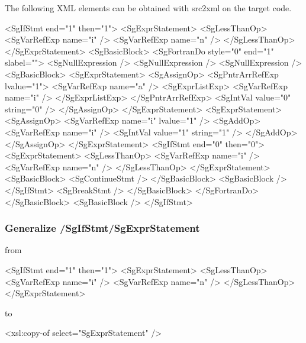 The following XML elements can be obtained with src2xml on the target code.

\begin{framed}
\begin{src}
<SgIfStmt end="1" then="1">
	<SgExprStatement>
		<SgLessThanOp>
			<SgVarRefExp name="i" />
			<SgVarRefExp name="n" />
		</SgLessThanOp>
	</SgExprStatement>
	<SgBasicBlock>
		<SgFortranDo style="0" end="1" slabel="">
			<SgNullExpression />
			<SgNullExpression />
			<SgNullExpression />
			<SgBasicBlock>
				<SgExprStatement>
					<SgAssignOp>
						<SgPntrArrRefExp lvalue="1">
							<SgVarRefExp name="a" />
							<SgExprListExp>
								<SgVarRefExp name="i" />
							</SgExprListExp>
						</SgPntrArrRefExp>
						<SgIntVal value="0" string="0" />
					</SgAssignOp>
				</SgExprStatement>
				<SgExprStatement>
					<SgAssignOp>
						<SgVarRefExp name="i" lvalue="1" />
						<SgAddOp>
							<SgVarRefExp name="i" />
							<SgIntVal value="1" string="1" />
						</SgAddOp>
					</SgAssignOp>
				</SgExprStatement>
				<SgIfStmt end="0" then="0">
					<SgExprStatement>
						<SgLessThanOp>
							<SgVarRefExp name="i" />
							<SgVarRefExp name="n" />
						</SgLessThanOp>
					</SgExprStatement>
					<SgBasicBlock>
						<SgContinueStmt />
					</SgBasicBlock>
					<SgBasicBlock />
				</SgIfStmt>
				<SgBreakStmt />
			</SgBasicBlock>
		</SgFortranDo>
	</SgBasicBlock>
	<SgBasicBlock />
</SgIfStmt>
\end{src}
\end{framed}

\subsubsection{Generalize /SgIfStmt/SgExprStatement}\label{subsubsec:cond}


from

\begin{framed}
\begin{src}
<SgIfStmt end="1" then="1">
	<SgExprStatement>
		<SgLessThanOp>
			<SgVarRefExp name="i" />
			<SgVarRefExp name="n" />
		</SgLessThanOp>
	</SgExprStatement>
\end{src}
\end{framed}

to

\begin{framed}
\begin{src}
		<xsl:copy-of select="SgExprStatement" />
\end{src}
\end{framed}

